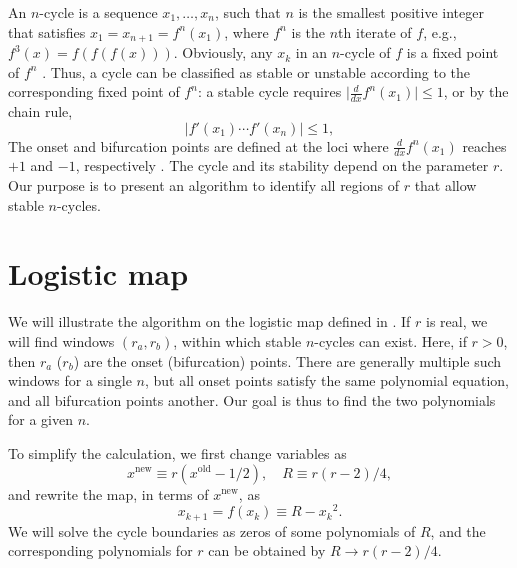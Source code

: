 \documentclass{ws-ijbc}
\begin{document}
An $n$-cycle is a sequence $x_1, \dots, x_n$,
  such that $n$ is the smallest positive integer
  that satisfies $x_1 = x_{n+1} = f^n(x_1)$,
  where $f^n$ is the $n$th iterate of $f$,
  e.g., $f^3(x) = f(f(f(x)))$.
Obviously, any $x_k$ in an $n$-cycle of $f$ is a fixed point of $f^n$
%
\big[but the converse is untrue, for a fixed point of $f^n$
  can also be a fixed point of $f^d$ for a divisor $d$ of $n$:
  if $f^d(x) = x$, then $f^n(x) = f^d(\cdots f^d(x)\cdots) = x$\big].
%
%
Thus, a cycle can be classified as stable or unstable
  according to the corresponding fixed point of $f^n$:
  a stable cycle requires
  $\big| \frac {d} {dx} f^n(x_1) \big| \le 1$,
  or by the chain rule,
%
%
%
\begin{equation}
  \Big| f'(x_1) \cdots f'(x_n) \Big| \le 1,
\label{eq:der}
\end{equation}
%
%
The onset and bifurcation points
  are defined at the loci
  where $\frac {d} {dx} f^n(x_1)$ reaches $+1$ and $-1$,
  respectively \cite{strogatz}.
%
%
%
The cycle and its stability depend on the parameter $r$.
%
Our purpose is to present an algorithm to identify
  all regions of $r$ that allow stable $n$-cycles.








\section{\label{sec:logmap}Logistic map}


We will illustrate the algorithm on the logistic map \cite{may, strogatz}
  defined in .
If $r$ is real,
  we will find windows $(r_a, r_b)$,
    within which stable $n$-cycles can exist.
%
Here, if $r > 0$, then
  $r_a$ ($r_b$) are the onset (bifurcation) points.
%
There are generally multiple such windows for a single $n$,
  but all onset points satisfy the same polynomial equation,
  and all bifurcation points another.
%
Our goal is thus to find the two polynomials for a given $n$.


To simplify the calculation, we first change variables \cite{saha} as
%
\[
    x^{\mathrm{new}} \equiv r(x^{\mathrm{old}} - 1/2),
    \quad R \equiv r(r-2)/4,
\]
%
and rewrite the map, in terms of $x^{\mathrm{new}}$, as
%
\begin{equation}
  x_{k+1} = f(x_k) \equiv R - {x_k}^2.
\label{eq:logmaps}
\end{equation}
%
%
We will solve the cycle boundaries as zeros of some polynomials of $R$,
and the corresponding polynomials for $r$ can be obtained by $R \rightarrow r(r-2)/4$.
%
%
\end{document}
